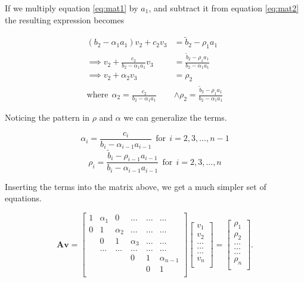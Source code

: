 \documentclass[reprint, english,notitlepage]{revtex4-1}  %
\begin{document}
If we multiply equation \ref{eq:mat1} by $a_1$, and subtract it from equation \ref{eq:mat2} the resulting expression becomes

\begin{align*}
	(b_2 - \alpha_1 a_1) v_2 + c_2 v_3 &= \tilde{b}_2 - \rho_1 a_1 \\
	\implies v_2 + \frac{c_2}{b_2 - \alpha_1 a_1}v_3 &= \frac{\tilde{b}_2 - \rho_1 a_1}{b_2 - \alpha_1 a_1} \\
	\implies v_2 + \alpha_2 v_3 &= \rho_2 \\
	\text{where}\ \ \alpha_2 = \frac{c_2}{b_2 - \alpha_1 a_1} &\wedge \rho_2 = \frac{\tilde{b}_2 - \rho_1 a_1}{b_2 - \alpha_1 a_1}
\end{align*}

Noticing the pattern in $\rho$ and $\alpha$ we can generalize the terms.

\begin{equation}
	\alpha_i = \frac{c_i}{b_i - \alpha_{i-1}a_{i-1}} \ \ \text{for} \ \ i = 2, 3, ..., n-1
	\label{eq:alpha}
\end{equation}
\begin{equation}
	\rho_i = \frac{\tilde{b}_{i} - \rho_{i-1} a_{i-1}}{b_{i} - \alpha_{i-1} a_{i-1}}\ \ \text{for} \ \ i = 2, 3, ..., n
	\label{eq:rho}
\end{equation}

Inserting the terms into the matrix above, we get a much simpler set of equations.

\begin{equation*}
	\mathbf{A}\mathbf{v} = \begin{bmatrix}
		1& \alpha_1 & 0 &\dots   & \dots &\dots \\
		0 & 1 & \alpha_2 &\dots &\dots &\dots \\
		& 0 & 1 & \alpha_3 & \dots & \dots \\
		& \dots   & \dots &\dots   &\dots & \dots \\
		&   &  &0  &1& \alpha_{n-1} \\
		&    &  &   &0 & 1 \\
	\end{bmatrix}\begin{bmatrix}
		v_1\\
		v_2\\
		\dots \\
		\dots  \\
		\dots \\
		v_n\\
	\end{bmatrix}
	=\begin{bmatrix}
		\rho_1\\
		\rho_2\\
		\dots \\
		\dots \\
		\dots \\
		\rho_n\\
	\end{bmatrix}.
\end{equation*}
\end{document}
